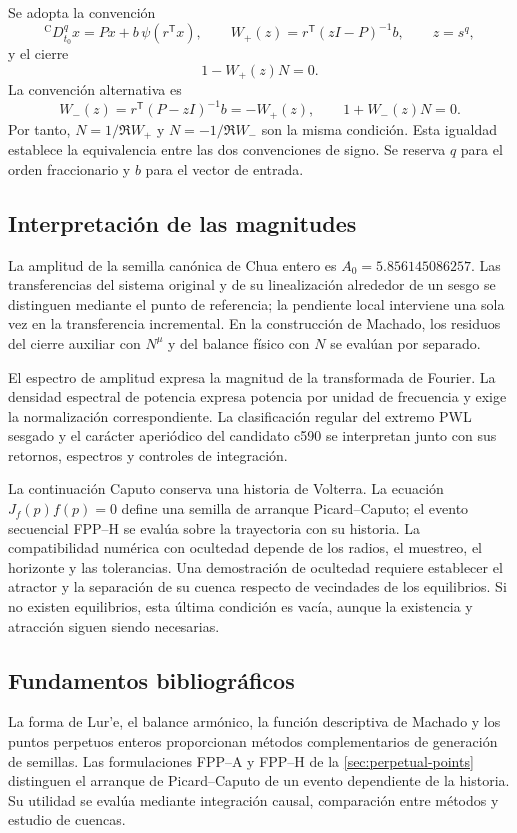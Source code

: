 Se adopta la convención
\begin{equation}
 {}^{\mathrm C}D_{t_0}^{q}x=Px+b\,\psi(r^{\mathsf T}x),
 \qquad
 W_+(z)=r^{\mathsf T}(zI-P)^{-1}b,
 \qquad z=s^q,
 \label{eq:master-wplus}
\end{equation}
y el cierre
\begin{equation}
 1-W_+(z)N=0.
 \label{eq:master-closure}
\end{equation}
La convención alternativa es
\begin{equation}
 W_-(z)=r^{\mathsf T}(P-zI)^{-1}b=-W_+(z),
 \qquad 1+W_-(z)N=0.
 \label{eq:master-wminus}
\end{equation}
Por tanto, \(N=1/\Re W_+\) y \(N=-1/\Re W_-\) son la misma condición. Esta
igualdad establece la equivalencia entre las dos convenciones de signo. Se
reserva \(q\) para el orden fraccionario y \(b\) para el vector de entrada.

\subsection{Interpretación de las magnitudes}

La amplitud de la semilla canónica de Chua entero es
\(A_0=5.856145086257\). Las transferencias del sistema original y de su
linealización alrededor de un sesgo se distinguen mediante el punto de
referencia; la pendiente local interviene una sola vez en la transferencia
incremental. En la construcción de Machado, los residuos del cierre auxiliar
con \(N^\mu\) y del balance físico con \(N\) se evalúan por separado.

El espectro de amplitud expresa la magnitud de la transformada de Fourier.
La densidad espectral de potencia expresa potencia por unidad de frecuencia
y exige la normalización correspondiente. La clasificación regular del
extremo PWL sesgado y el carácter aperiódico del candidato c590 se interpretan
junto con sus retornos, espectros y controles de integración.

La continuación Caputo conserva una historia de Volterra. La ecuación
\(J_f(p)f(p)=0\) define una semilla de arranque Picard--Caputo; el evento
secuencial FPP--H se evalúa sobre la trayectoria con su historia. La
compatibilidad numérica con ocultedad depende de los radios, el muestreo,
el horizonte y las tolerancias. Una demostración de ocultedad requiere
establecer el atractor y la separación de su cuenca respecto de vecindades
de los equilibrios. Si no existen equilibrios, esta última condición es
vacía, aunque la existencia y atracción siguen siendo necesarias.

\subsection{Fundamentos bibliográficos}

La forma de Lur'e, el balance armónico, la función descriptiva de Machado
y los puntos perpetuos enteros proporcionan métodos complementarios de
generación de semillas. Las formulaciones FPP--A y FPP--H de la
\cref{sec:perpetual-points} distinguen el arranque de Picard--Caputo de un
evento dependiente de la historia. Su utilidad se evalúa mediante integración
causal, comparación entre métodos y estudio de cuencas.
